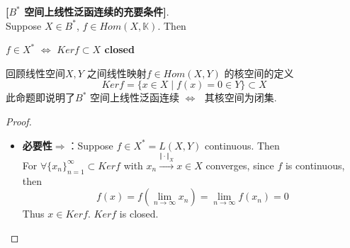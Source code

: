 	\begin{proposition}\label{prop 4.1.2}
		\textbf{[$B^*$ 空间上线性泛函连续的充要条件]}. \\
		Suppose $X \in B^*$, $f \in Hom(X , \mathbb{K})$. Then
		\begin{center}
			\textbf{$f \in X^* \,\, \Leftrightarrow \,\, Ker f \subset X$ closed}
		\end{center}
		
		\vspace*{2em}
		
		\begin{rmk}
			回顾线性空间$X , Y$ 之间线性映射$f \in Hom(X , Y)$ 的核空间的定义
			\[ Kerf = \{ x \in X \mid f(x) = 0 \in Y \} \subset X \]
			此命题即说明了$B^*$ 空间上线性泛函连续$\,\, \Leftrightarrow \,\,$ 其核空间为闭集. 
		\end{rmk}
		
		\vspace*{4em}
		
		\begin{proof}
			\begin{itemize}
				\item \textbf{必要性$\Rightarrow$}：Suppose $f \in X^* = L(X , Y)$ continuous. Then \\
				For $\forall \{ x_n \}_{n = 1}^{\infty} \subset Ker f$ with $x_n \overset{\Vert \cdot \Vert_X}{\to} x \in X$ converges, since $f$ is continuous, then
				\[ f(x) = f \left( \lim_{n \to \infty} x_n \right) = \lim_{n \to \infty} f(x_n) = 0 \]
				Thus $x \in Ker f$. $Ker f$ is closed. 
				
				\vspace*{6em}
				

\end{itemize}
\end{proof}
\end{proposition}
